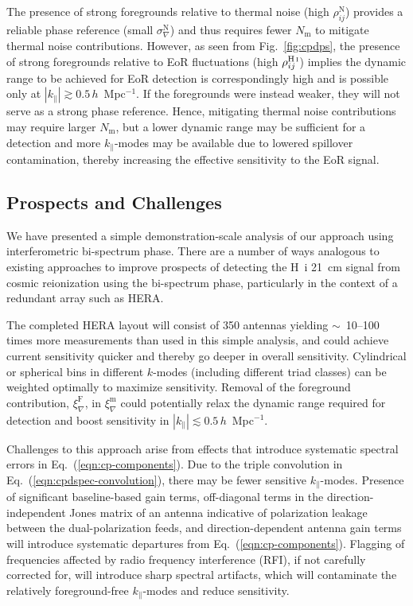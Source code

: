 \documentclass[
reprint,
superscriptaddress,
amsmath,
amssymb,
aps,
prd
]{revtex4-1}
\newcommand{\HI}{H\,{\sc i}}
\begin{document}
The presence of strong foregrounds relative to thermal noise (high $\rho_{ij}^\textrm{N}$) provides a reliable phase reference (small $\sigma_\nabla^\textrm{N}$) and thus requires fewer $N_\textrm{m}$ to mitigate thermal noise contributions. However, as seen from Fig.~\ref{fig:cpdps}, the presence of strong foregrounds relative to EoR fluctuations (high $\rho_{ij}^\textrm{\HI}$) implies the dynamic range to be achieved for EoR detection is correspondingly high and is possible only at $|k_\parallel| \gtrsim 0.5\,h$~Mpc$^{-1}$. If the foregrounds were instead weaker, they will not serve as a strong phase reference. Hence, mitigating thermal noise contributions may require larger $N_\textrm{m}$, but a lower dynamic range may be sufficient for a detection and more $k_\parallel$-modes may be available due to lowered spillover contamination, thereby increasing the effective sensitivity to the EoR signal. 

\subsection{Prospects and Challenges}\label{sec:prospects-challenges}

We have presented a simple demonstration-scale analysis of our approach using interferometric bi-spectrum phase. There are a number of ways analogous to existing approaches to improve prospects of detecting the H~{\sc i} 21~cm signal from cosmic reionization using the bi-spectrum phase, particularly in the context of a redundant array such as HERA. 

The completed HERA layout will consist of 350 antennas yielding $\sim$~10--100 times more measurements than used in this simple analysis, and could achieve current sensitivity quicker and thereby go deeper in overall sensitivity. Cylindrical or spherical bins in different $k$-modes (including different triad classes) can be weighted optimally \cite{liu14a,liu14b,dil15} to maximize sensitivity. Removal of the foreground contribution, $\xi_\nabla^\textrm{F}$, in $\xi_\nabla^\textrm{m}$ could potentially relax the dynamic range required for detection and boost sensitivity in $|k_\parallel| \lesssim 0.5\,h$~Mpc$^{-1}$.

Challenges to this approach arise from effects that introduce systematic spectral errors in Eq.~(\ref{eqn:cp-components}). Due to the triple convolution in Eq.~(\ref{eqn:cpdspec-convolution}), there may be  fewer sensitive $k_\parallel$-modes. Presence of significant baseline-based gain terms, off-diagonal terms in the direction-independent Jones matrix of an antenna indicative of polarization leakage between the dual-polarization feeds, and direction-dependent antenna gain terms will introduce systematic departures from Eq.~(\ref{eqn:cp-components}). Flagging of frequencies affected by radio frequency interference (RFI), if not carefully corrected for, will introduce sharp spectral artifacts, which will contaminate the relatively foreground-free $k_\parallel$-modes and reduce sensitivity.
\end{document}
